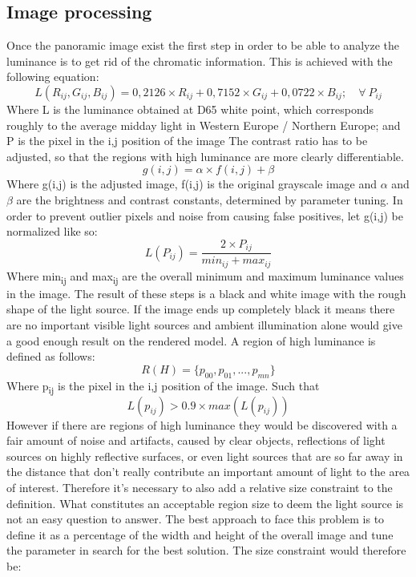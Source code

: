 \subsection{Image processing}
Once the panoramic image exist the first step in order to be able to analyze the luminance is to get rid of the chromatic information. This is achieved with the following equation:
\[
    L(R_{ij},G_{ij},B_{ij}) = 0,2126 \times R_{ij} + 0,7152 \times G_{ij} + 0,0722 \times B_{ij}; \quad \forall \  P_{ij}
\]
Where L is the luminance obtained at D65 white point, which corresponds roughly to the average midday light in Western Europe / Northern Europe; and P is the pixel in the i,j position of the image \newline
The contrast ratio has to be adjusted, so that the regions with high luminance are more clearly differentiable. 
\[
    g(i,j) = \alpha \times f(i,j) + \beta
\]
Where g(i,j) is the adjusted image, f(i,j) is the original grayscale image and $\alpha$ and $\beta$ are the brightness and contrast constants, determined by parameter tuning.
In order to prevent outlier pixels and noise from causing false positives, let g(i,j) be normalized like so:
\[
    L(P_{ij}) = \frac{ 2 \times P_{ij} }{min_{ij} + max_{ij}}
\]
Where min\textsubscript{ij} and max\textsubscript{ij} are the overall minimum and maximum luminance values in the image. 
\newline
The result of these steps is a black and white image with the rough shape of the light source. If the image ends up completely black it means there are no important visible light sources and ambient illumination alone would give a good enough result on the rendered model. A region of high luminance is defined as follows:
\[
    R(H) = \{p_{00}, p_{01}, ... , p_{mn}\}
\]
 Where p\textsubscript{ij} is the pixel in the i,j position of the image. Such that 
\[
    L(p_{ij}) > 0.9 \times max(L(p_{ij})) 
\]
However if there are regions of high luminance they would be discovered with a fair amount of noise and artifacts, caused by clear objects, reflections of light sources on highly reflective surfaces, or even light sources that are so far away in the distance that don't really contribute an important amount of light to the area of interest. Therefore it's necessary to also add a relative size constraint to the definition. What constitutes an acceptable region size to deem the light source is not an easy question to answer. The best approach to face this problem is to define it as a percentage of the width and height of the overall image and tune the parameter in search for the best solution. The size constraint would therefore be:

